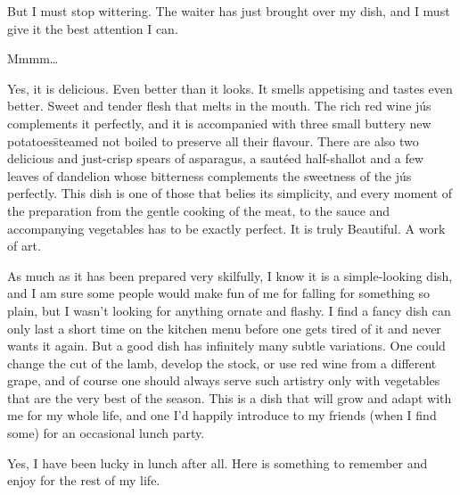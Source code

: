 But I must stop wittering. The waiter has just brought over my dish, and I
must give it the best attention I can.

Mmmm\ldots

Yes, it is delicious. Even better than it looks. It smells appetising
and tastes even better. Sweet and tender flesh that melts in the
mouth. The rich red wine j\'us complements it perfectly, and
it is accompanied with three small buttery new potatoes\=steamed
not boiled to preserve all their flavour.  There are also
two delicious and just-crisp spears of asparagus, a saut\'eed
half-shallot and a few leaves of dandelion whose bitterness complements
the sweetness of the j\'us perfectly. This dish is one of those
that belies its simplicity, and every moment of the preparation from the
gentle cooking of the meat, to the sauce and accompanying vegetables
has to be exactly perfect.  It is truly Beautiful.  A work of art.

As much as it has been prepared very skilfully, I know it is a
simple-looking dish, and I am sure some people would make fun of
me for falling for something so plain, but I wasn't looking for
anything ornate and flashy.  I find a fancy dish can only last a short
time on the kitchen menu before one gets tired of it and never wants
it again. But a good dish has infinitely many subtle variations.  One
could change the cut of the lamb, develop the stock, or use red wine
from a different grape, and of course one should always serve such
artistry only with
vegetables that are the very best of the season.  This is a dish that
will grow and adapt with me for my whole life, and one I'd happily
introduce to my friends (when I find some) for an occasional lunch party.

Yes, I have been lucky in lunch after all. Here is something to
remember and enjoy for the rest of my life.


